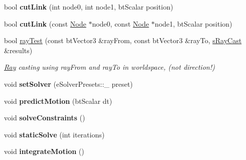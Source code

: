 \begin{DoxyCompactItemize}
\item 
\hypertarget{classbt_soft_body_a16f221920ddcc0485c13e6fba169c291}{bool {\bfseries cut\+Link} (int node0, int node1, bt\+Scalar position)}\label{classbt_soft_body_a16f221920ddcc0485c13e6fba169c291}

\item 
\hypertarget{classbt_soft_body_a1dd5a0790a03d3680f2dc939ea3a19e5}{bool {\bfseries cut\+Link} (const \hyperlink{structbt_soft_body_1_1_node}{Node} $\ast$node0, const \hyperlink{structbt_soft_body_1_1_node}{Node} $\ast$node1, bt\+Scalar position)}\label{classbt_soft_body_a1dd5a0790a03d3680f2dc939ea3a19e5}

\item 
\hypertarget{classbt_soft_body_a3133d790dcff71b8e8a43eb966097485}{bool \hyperlink{classbt_soft_body_a3133d790dcff71b8e8a43eb966097485}{ray\+Test} (const bt\+Vector3 \&ray\+From, const bt\+Vector3 \&ray\+To, \hyperlink{structbt_soft_body_1_1s_ray_cast}{s\+Ray\+Cast} \&results)}\label{classbt_soft_body_a3133d790dcff71b8e8a43eb966097485}

\begin{DoxyCompactList}\small\item\em \hyperlink{class_ray}{Ray} casting using ray\+From and ray\+To in worldspace, (not direction!) \end{DoxyCompactList}\item 
\hypertarget{classbt_soft_body_a9da956f8d824e44cae9f8b37eff54c19}{void {\bfseries set\+Solver} (e\+Solver\+Presets\+::\+\_\+ preset)}\label{classbt_soft_body_a9da956f8d824e44cae9f8b37eff54c19}

\item 
\hypertarget{classbt_soft_body_a37b6906ab9c76448b81254ae3748ef66}{void {\bfseries predict\+Motion} (bt\+Scalar dt)}\label{classbt_soft_body_a37b6906ab9c76448b81254ae3748ef66}

\item 
\hypertarget{classbt_soft_body_a98390e324d098502e6e9fb1ea2e52ab6}{void {\bfseries solve\+Constraints} ()}\label{classbt_soft_body_a98390e324d098502e6e9fb1ea2e52ab6}

\item 
\hypertarget{classbt_soft_body_a653fd3d83a1f7a8d0547b20e17af4483}{void {\bfseries static\+Solve} (int iterations)}\label{classbt_soft_body_a653fd3d83a1f7a8d0547b20e17af4483}

\item 
\hypertarget{classbt_soft_body_a21d3a56dff4c4999a2da272b712e616c}{void {\bfseries integrate\+Motion} ()}\label{classbt_soft_body_a21d3a56dff4c4999a2da272b712e616c}


\end{DoxyCompactItemize}
